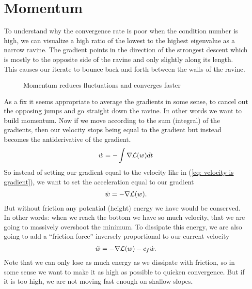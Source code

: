 
\chapter{Momentum}\label{chap: momentum}

To understand why the convergence rate is poor when the condition
number is high, we can visualize a high ratio of the lowest to the highest
eigenvalue as a narrow ravine. The gradient points in the direction of the
strongest descent which is mostly to the opposite side of the ravine and only slightly
along its length. This causes our iterate to bounce back and forth between
the walls of the ravine.
%
\begin{figure}[h]
	\centering
	\def\svgwidth{1\textwidth}
	
	\caption{Momentum reduces fluctuations and converges faster}
	\label{fig: visualize bad conditioning}
\end{figure}

As a fix it seems appropriate to average the gradients in some sense, to
cancel out the opposing jumps and go straight down the ravine. In other words
we want to build momentum. Now if we move according to the sum (integral) of
the gradients, then our velocity stops being equal to the gradient but instead
becomes the antiderivative of the gradient.
\begin{align*}
	\dot{w} = -\int\nabla\mathcal{L}(w)dt
\end{align*}
So instead of setting our gradient equal to the velocity like in (\ref{eq:
velocity is gradient}), we want to set the acceleration equal to our gradient
%
\begin{align*}
	\ddot{w} = -\nabla \mathcal{L}(w).
\end{align*}
%
But without friction any potential (height) energy we have would be conserved.
In other words: when we reach the bottom we have so much velocity, that we are
going to massively overshoot the minimum. To dissipate this energy, we are also
going to add a ``friction force'' inversely proportional to our current velocity
%
\begin{align}\label{eq: acceleration is gradient + friction}
	\ddot{w} = -\nabla \mathcal{L}(w) - c_f \dot{w}.
\end{align}
Note that we can only lose as much energy as we dissipate with friction, so in
some sense we want to make it as high as possible to quicken convergence. But
if it is too high, we are not moving fast enough on shallow slopes.

